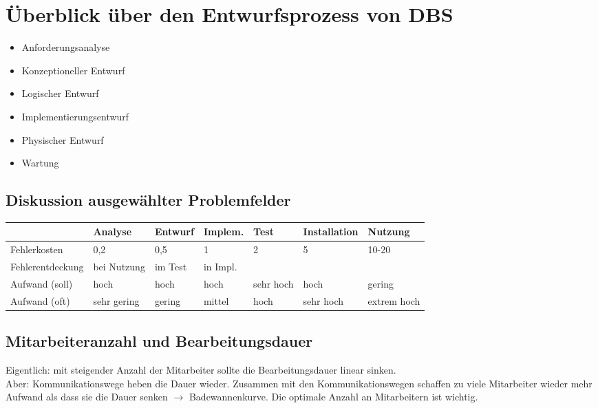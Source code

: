 \section{Überblick über den Entwurfsprozess von DBS}
\begin{itemize}
\item Anforderungsanalyse
\item Konzeptioneller Entwurf
\item Logischer Entwurf
\item Implementierungsentwurf
\item Physischer Entwurf
\item Wartung
\end{itemize}
\subsection{Diskussion ausgewählter Problemfelder}
\begin{tabular}{l | l | l | l | l | l | l}
& Analyse & Entwurf & Implem. & Test & Installation & Nutzung\\\hline
Fehlerkosten & 0,2 & 0,5 & 1 & 2 & 5 & 10-20\\
Fehlerentdeckung & bei Nutzung & im Test & in Impl. & & \\
Aufwand (soll) & hoch & hoch & hoch & sehr hoch & hoch & gering\\
Aufwand (oft) &  sehr gering & gering & mittel & hoch & sehr hoch & extrem hoch\\

\end{tabular}
\subsection{Mitarbeiteranzahl und Bearbeitungsdauer}
Eigentlich: mit steigender Anzahl der Mitarbeiter sollte die Bearbeitungsdauer linear sinken.\\
Aber: Kommunikationswege heben die Dauer wieder. Zusammen mit den Kommunikationswegen schaffen zu viele Mitarbeiter wieder mehr Aufwand als dass sie die Dauer senken $\to$ Badewannenkurve. Die optimale Anzahl an Mitarbeitern ist wichtig.
